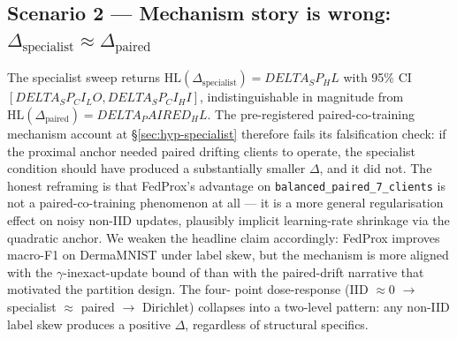 \subsection*{Scenario 2 — Mechanism story is wrong:
$\Delta_{\mathrm{specialist}} \approx \Delta_{\mathrm{paired}}$}
The specialist sweep returns $\mathrm{HL}(\Delta_{\mathrm{specialist}}) =
{DELTA_SP_HL}$ with 95\% CI $[{DELTA_SP_CI_LO}, {DELTA_SP_CI_HI}]$,
indistinguishable in magnitude from $\mathrm{HL}(\Delta_{\mathrm{paired}})
= {DELTA_PAIRED_HL}$. The pre-registered paired-co-training mechanism
account at \S\ref{sec:hyp-specialist} therefore fails its falsification
check: if the proximal anchor needed paired drifting clients to operate,
the specialist condition should have produced a substantially smaller
$\Delta$, and it did not. The honest reframing is that FedProx's
advantage on \texttt{balanced\_paired\_7\_clients} is not a
paired-co-training phenomenon at all — it is a more general
regularisation effect on noisy non-IID updates, plausibly implicit
learning-rate shrinkage via the quadratic anchor. We weaken the
headline claim accordingly: FedProx improves macro-F1 on DermaMNIST
under label skew, but the mechanism is more aligned with the
$\gamma$-inexact-update bound of \citet{li2020fedprox} than with the
paired-drift narrative that motivated the partition design. The four-
point dose-response (IID $\approx 0$ $\to$ specialist $\approx$ paired
$\to$ Dirichlet) collapses into a two-level pattern: any non-IID label
skew produces a positive $\Delta$, regardless of structural specifics.

